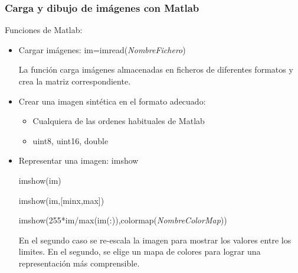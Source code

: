 \begin{frame}
\frametitle{Carga y dibujo de im\'{a}genes con Matlab}

\small

Funciones de Matlab:

\begin{itemize}

\small

\item Cargar im\'{a}genes: \color{blue} im=imread(\textit{NombreFichero}) \color{black}

\color{gray}
La funci\'{o}n carga im\'{a}genes almacenadas en ficheros de diferentes formatos y crea la matriz correspondiente.
\color{black}

\item Crear una imagen sint\'{e}tica en el formato adecuado:
\begin{itemize}
\item Cualquiera de las ordenes habituales de Matlab
\item \color{blue} uint8, uint16, double \color{black}
\end{itemize}

\item Representar una imagen: \color{blue} imshow\color{black}

\hspace{0.5cm}\color{blue} imshow(im) \color{black}

\hspace{0.5cm}\color{blue} imshow(im,[minx,max]) \color{black}

\hspace{0.5cm}\color{blue} imshow(255*im/max(im(:)),colormap(\textit{NombreColorMap})) \color{black}

\color{gray}
En el segundo caso se re-escala la imagen para mostrar los valores entre los limites. En el segundo, se elige un mapa de colores para lograr una representaci\'{o}n m\'{a}s comprensible.

\color{black}



\end{itemize}

\end{frame}



